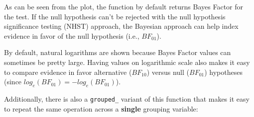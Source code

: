 \documentclass[]{article}
\begin{document}
As can be seen from the plot, the function by default returns Bayes
Factor for the test. If the null hypothesis can't be rejected with the
null hypothesis significance testing (NHST) approach, the Bayesian
approach can help index evidence in favor of the null hypothesis (i.e.,
\(BF_{01}\)).

By default, natural logarithms are shown because Bayes Factor values can
sometimes be pretty large. Having values on logarithmic scale also makes
it easy to compare evidence in favor alternative (\(BF_{10}\)) versus
null (\(BF_{01}\)) hypotheses (since
\(log_{e}(BF_{01}) = - log_{e}(BF_{01})\)).

Additionally, there is also a \texttt{grouped\_} variant of this
function that makes it easy to repeat the same operation across a
\textbf{single} grouping variable:
\end{document}
